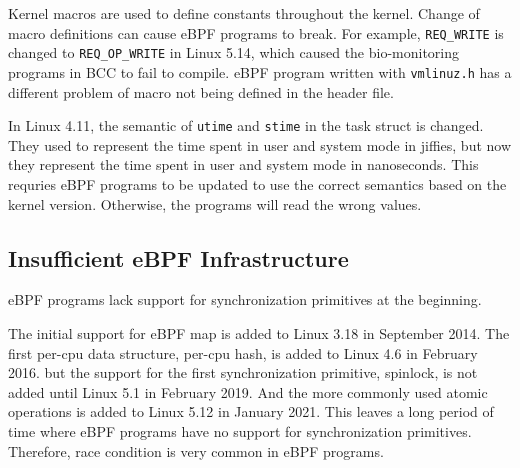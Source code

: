 Kernel macros are used to define constants throughout the kernel.
Change of macro definitions can cause eBPF programs to break. 
For example, \texttt{REQ\_WRITE} is changed to \texttt{REQ\_OP\_WRITE} in Linux 5.14, which caused the bio-monitoring programs in BCC to fail to compile.
eBPF program written with \texttt{vmlinuz.h} has a different problem of macro not being defined in the header file.


In Linux 4.11, the semantic of \texttt{utime} and \texttt{stime} in the task struct is changed. They used to represent the time spent in user and system mode in jiffies, but now they represent the time spent in user and system mode in nanoseconds. This requries eBPF programs to be updated to use the correct semantics based on the kernel version. Otherwise, the programs will read the wrong values.



\subsection{Insufficient eBPF Infrastructure}

eBPF programs lack support for synchronization primitives at the beginning. 

The initial support for eBPF map is added to Linux 3.18 in September 2014.
The first per-cpu data structure, per-cpu hash, is added to Linux 4.6 in February 2016. 
but the support for the first synchronization primitive, spinlock, is not added until Linux 5.1 in February 2019. And the more commonly used atomic operations is added to Linux 5.12 in January 2021.
This leaves a long period of time where eBPF programs have no support for synchronization primitives.
Therefore, race condition is very common in eBPF programs. 

